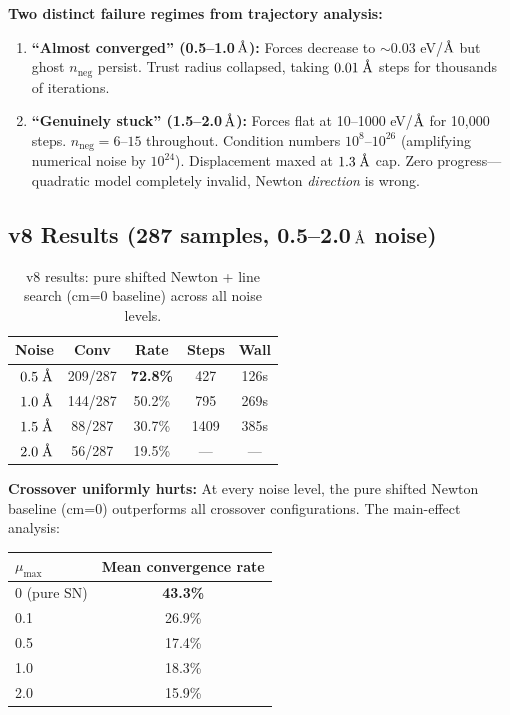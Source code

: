 \documentclass[11pt,a4paper]{article}
\newcommand{\angstrom}{\text{\r{A}}}
\begin{document}
\textbf{Two distinct failure regimes from trajectory analysis:}
\begin{enumerate}
  \item \textbf{``Almost converged'' (0.5--1.0\,$\angstrom$):} Forces decrease to $\sim\!0.03$ eV/$\angstrom$ but ghost $n_\text{neg}$ persist. Trust radius collapsed, taking $0.01\;\angstrom$ steps for thousands of iterations.
  \item \textbf{``Genuinely stuck'' (1.5--2.0\,$\angstrom$):} Forces flat at 10--1000 eV/$\angstrom$ for 10,000 steps. $n_\text{neg} = 6$--$15$ throughout. Condition numbers $10^8$--$10^{26}$ (amplifying numerical noise by $10^{24}$). Displacement maxed at $1.3\;\angstrom$ cap. Zero progress---quadratic model completely invalid, Newton \emph{direction} is wrong.
\end{enumerate}

\subsection{v8 Results (287 samples, 0.5--2.0\,$\angstrom$ noise)}

\begin{table}[H]
\centering
\caption{v8 results: pure shifted Newton + line search (cm=0 baseline) across all noise levels.}
\label{tab:v8-baseline}
\begin{tabular}{rcccc}
\toprule
Noise & Conv & Rate & Steps & Wall \\
\midrule
$0.5\;\angstrom$ & 209/287 & \textbf{72.8\%} & 427 & 126s \\
$1.0\;\angstrom$ & 144/287 & 50.2\% & 795 & 269s \\
$1.5\;\angstrom$ & 88/287 & 30.7\% & 1409 & 385s \\
$2.0\;\angstrom$ & 56/287 & 19.5\% & --- & --- \\
\bottomrule
\end{tabular}
\end{table}

\textbf{Crossover uniformly hurts:} At every noise level, the pure shifted Newton baseline (cm=0) outperforms all crossover configurations. The main-effect analysis:

\begin{center}
\begin{tabular}{lc}
\toprule
$\mu_\text{max}$ & Mean convergence rate \\
\midrule
0 (pure SN) & \textbf{43.3\%} \\
0.1 & 26.9\% \\
0.5 & 17.4\% \\
1.0 & 18.3\% \\
2.0 & 15.9\% \\
\bottomrule
\end{tabular}
\end{center}
\end{document}
